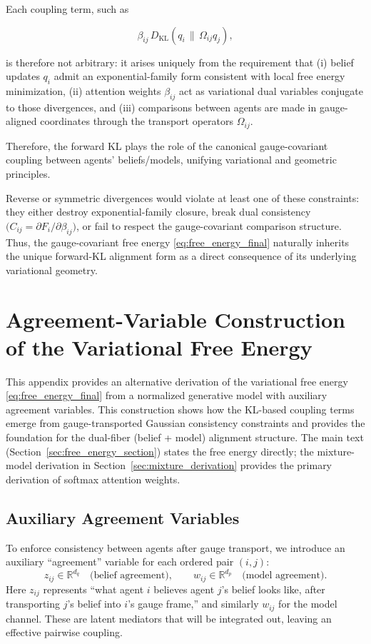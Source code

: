 \documentclass[twoside,11pt]{article}
\begin{document}
Each coupling term, such as

$$
\beta_{ij}\,D_{\mathrm{KL}}(q_i \,\|\, \Omega_{ij} q_j),
$$

is therefore not arbitrary: it arises uniquely from the requirement that (i) belief updates $q_i$ admit an exponential-family form consistent with local free energy minimization, (ii) attention weights $\beta_{ij}$ act as variational dual variables conjugate to those divergences, and (iii) comparisons between agents are made in gauge-aligned coordinates through the transport operators $\Omega_{ij}$.

Therefore, the forward KL plays the role of the canonical gauge-covariant coupling between agents' beliefs/models, unifying variational and geometric principles.

Reverse or symmetric divergences would violate at least one of these constraints: they either destroy exponential-family closure, break dual consistency $\big(C_{ij} = \partial F_i / \partial \beta_{ij}\big)$, or fail to respect the gauge-covariant comparison structure. Thus, the gauge-covariant free energy \eqref{eq:free_energy_final} naturally inherits the unique forward-KL alignment form as a direct consequence of its underlying variational geometry.



\section{Agreement-Variable Construction of the Variational Free Energy}
\label{app:agreement_variables}

This appendix provides an alternative derivation of the variational free energy \eqref{eq:free_energy_final} from a normalized generative model with auxiliary agreement variables. This construction shows how the KL-based coupling terms emerge from gauge-transported Gaussian consistency constraints and provides the foundation for the dual-fiber (belief + model) alignment structure. The main text (Section~\ref{sec:free_energy_section}) states the free energy directly; the mixture-model derivation in Section~\ref{sec:mixture_derivation} provides the primary derivation of softmax attention weights.

\subsection{Auxiliary Agreement Variables}

To enforce consistency between agents after gauge transport, we introduce an auxiliary ``agreement'' variable for each ordered pair $(i,j)$:
\begin{equation}
z_{ij} \in \mathbb{R}^{d_q} \quad \text{(belief agreement)},
\qquad
w_{ij} \in \mathbb{R}^{d_p} \quad \text{(model agreement)}.
\label{eq:agreement_vars}
\end{equation}
Here $z_{ij}$ represents ``what agent $i$ believes agent $j$'s belief looks like, after transporting $j$'s belief into $i$'s gauge frame,'' and similarly $w_{ij}$ for the model channel. These are latent mediators that will be integrated out, leaving an effective pairwise coupling.
\end{document}
